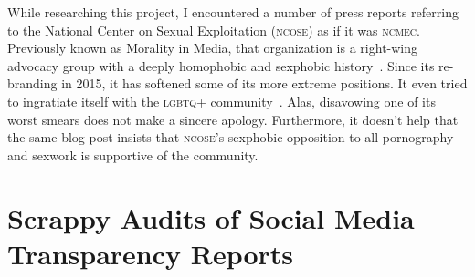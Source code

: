 \documentclass[nonacm,screen]{acmart}
\newcommand\V[1]{\textsc{\MakeLowercase{#1}}}
\begin{document}
While researching this project, I encountered a number of press reports
referring to the National Center on Sexual Exploitation (\V{NCOSE}) as if it was
\V{NCMEC}. Previously known as Morality in Media, that organization is a
right-wing advocacy group with a deeply homophobic and sexphobic
history~\cite{WikipediaNCOSE}. Since its re-branding in 2015, it has softened
some of its more extreme positions. It even tried to ingratiate itself with the
\V{LGBTQ+} community~\cite{Hawkins2023a}. Alas, disavowing one of its worst
smears does not make a sincere apology. Furthermore, it doesn't help that the
same blog post insists that \V{NCOSE}'s sexphobic opposition to all pornography
and sexwork is supportive of the community.



\section{Scrappy Audits of Social Media Transparency Reports}
\label{sec:audits}
\end{document}
